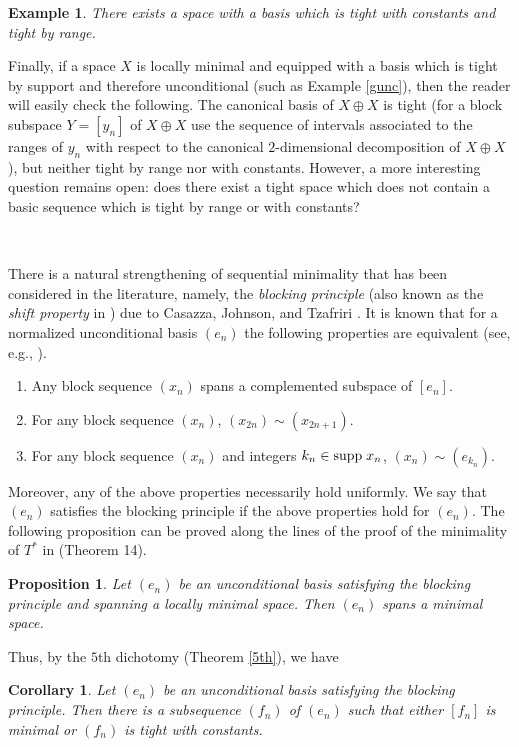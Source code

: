 \documentclass[10pt]{amsart}
\numberwithin{equation}{section}
\newtheorem{cor}[thm]{Corollary}
\newtheorem{prop} [thm] {Proposition}
\newtheorem{ex}[thm]{Example}
\begin{document}
\begin{ex}\cite{exemples}
There exists a space with a basis which is tight with constants and tight by
range.
\end{ex}

Finally, if a space $X$ is locally minimal and equipped with a basis which is
tight by support and therefore unconditional (such as Example \ref{gunc}),
then the reader will easily check the following. The canonical basis of $X
\oplus X$ is tight (for a block subspace $Y=[y_n]$ of $X \oplus X$ use the sequence
of intervals associated to the ranges of $y_n$ with respect to the canonical
$2$-dimensional decomposition of $X \oplus X$), but neither tight by range nor
with constants.
However, a more interesting question remains open: does there exist a tight
space which does not contain a basic sequence which is tight by range or with
constants?

\

There is a natural strengthening of sequential minimality that has been
considered in the literature, namely, the {\em blocking principle} (also known
as the {\em shift property} in \cite{CK}) due to Casazza, Johnson, and Tzafriri
\cite{CJT}. It is known that for a normalized unconditional basis $(e_n)$ the
following properties are equivalent (see, e.g., \cite{ergodic}).
\begin{enumerate}
  \item Any block sequence $(x_n)$ spans a complemented subspace of $[e_n]$.
  \item For any block sequence $(x_n)$, $(x_{2n})\sim (x_{2n+1})$.
  \item For any block sequence $(x_n)$ and integers $k_n\in {\rm supp}\;x_n$, $(x_n)\sim (e_{k_n})$.
\end{enumerate}
Moreover, any of the above properties necessarily hold uniformly. We say that
$(e_n)$ satisfies the blocking principle if the above properties hold for
$(e_n)$. The following proposition can be proved along the lines of the proof
of the minimality of $T^*$ in \cite{CJT} (Theorem 14).

\begin{prop}
Let $(e_n)$ be an unconditional basis satisfying the blocking principle and
spanning a locally minimal space. Then $(e_n)$ spans a minimal space.
\end{prop}
Thus, by the $5$th dichotomy (Theorem \ref{5th}), we have

\begin{cor}
Let $(e_n)$ be an unconditional basis satisfying the blocking principle. Then
there is a subsequence $(f_n)$ of $(e_n)$ such that either $[f_n]$ is minimal
or $(f_n)$ is tight with constants.
\end{cor}
\end{document}
